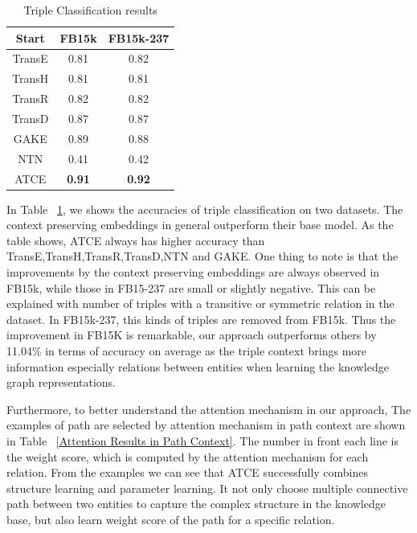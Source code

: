 \begin{table}
 \centering
 \caption{Triple Classification results}
  \label{Triple Classification_results}
\begin{tabular}{c|c|c}
  \hline
  Start & FB15k  & FB15k-237 \\
  \hline
  TransE & 0.81 & 0.82 \\
  TransH & 0.81 & 0.81 \\
  TransR & 0.82 & 0.82 \\
  TransD & 0.87 & 0.87 \\
  GAKE & 0.89 & 0.88 \\
  NTN & 0.41 & 0.42 \\
  \hline
  ATCE & \textbf{0.91} & \textbf{0.92} \\
  \hline
\end{tabular}
\end{table}
In Table ~\ref{Triple Classification_results}, we shows the accuracies of triple classification on two datasets. The context preserving embeddings in general outperform their base model. As the table shows, ATCE always has higher accuracy than TransE,TransH,TransR,TransD,NTN and GAKE. One thing to note is that the improvements by the context preserving embeddings are always observed in FB15k, while those in FB15-237 are small or slightly negative. This can be explained with number of triples with a transitive or symmetric relation in the dataset. In FB15k-237, this kinds of triples are removed from FB15k. Thus the improvement in FB15K is remarkable, our approach outperforms others by 11.04\% in terms of accuracy on average as the triple context brings more information especially relations between entities when learning the knowledge graph representations.

Furthermore, to better understand the attention mechanism in our approach, The examples of path are selected by attention mechanism in path context are shown in Table ~\ref{Attention Results in Path Context}. The number in front each line is the weight score, which is computed by the attention mechanism for each relation. From the examples we can see that ATCE successfully combines structure learning and parameter learning. It not only choose multiple connective path between two entities to capture the complex structure in the knowledge base, but also learn weight score of the path for a specific relation.

